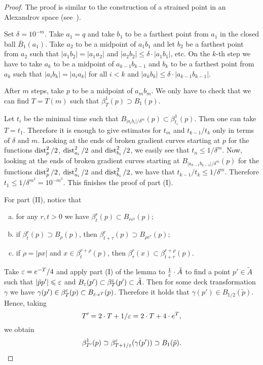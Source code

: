\documentclass{amsart}
\begin{document}
\begin{proof}
The proof is similar to the construction of a strained point in an  Alexandrov space (see~\cite{BGP}).

Set $\delta=10^{-m}$.
Take $a_1=q$ and take $b_1$ to be a farthest point from $a_1$ in the closed ball $\bar B_1(a_1)$.
Take $a_2$ to be a midpoint of $a_1b_1$ and let  $b_2$ be
a farthest point from $a_2$
such that $|a_1b_2|=|a_1a_2|$ and $|a_2b_2|\le\delta\cdot |a_1b_1|$, etc.
On the $k$-th step we have to take $a_{k}$ to be a midpoint of
$a_{k-1}b_{k-1}$
and $b_{k}$
to be a farthest point from $a_{k}$
such that $|a_ib_{k}|=|a_ia_{k}|$ for all $i< k$  and
$|a_{k}b_{k}|\le\delta\cdot  |a_{k-1}b_{k-1}|$.

After $m$ steps, take $p$ to be a midpoint of $a_mb_m$.
We only have to check that we can find $T=T(m)$
such that $\beta^{1}_T(p)\supset B_1(p)$.

Let $t_i$ be the minimal time such that $B_{|a_ib_i|/\delta^m}(p)\subset \beta^{1}_{t_i}(p)$.
Then one can take $T=t_1$.
Therefore it is enough to give estimates for $t_m$ and $t_{k-1}/t_k$ only in terms of $\delta$ and $m$.
Looking at the ends of broken gradient curves
starting at $p$
for the functions $\operatorname{\rm dist}^2_{p}/2$, $\operatorname{\rm dist}^2_{a_i}/2$
and $ \operatorname{\rm dist}^2_{b_i}/2$, we easily see that $t_n\le 1/\delta^m$.
Now, looking
at the ends of broken gradient curves
starting at $ B_{|a_{k-1}b_{k-1}|/\delta^m}(p)$ for
the functions $\operatorname{\rm dist}^2_{p}/2$, $\operatorname{\rm dist}^2_{a_i}/2$
and $ \operatorname{\rm dist}^2_{b_i}/2$,
we have that $t_{k-1}/t_{k}\le 1/\delta^m$.
Therefore $t_1\le 1/\delta^{m^2}=10^{-m^3}$.
This finishes the proof of part (I).

For part (II),
notice that
\begin{enumerate}[a)]
\item for any $r,t>0$ we have
$\beta^r_t(p)\subset B_{re^t}(p);$
\item if $\beta^r_t(p)\supset B_{\rho}(p)$, then
$\beta^r_{t+\tau}(p)\supset B_{\rho e^\tau}(p);$
\item if $\rho=|px|$ and $x\in \beta^{r+\rho}_t(p)$,
then $\beta^{r}_\tau(x)\subset \beta^{r+\rho}_{t+\tau}(p)$.
\end{enumerate}
Take $\varepsilon=e^{-T}/4$ and apply part (I) of the lemma to $\frac1{\varepsilon}\cdot \tilde A$
to find a point $p'\in \tilde A$ such that $|\tilde pp'|\leqslant \varepsilon$
and $B_{\varepsilon}(p')\subset \beta^{\varepsilon}_{T}(p')\subset \tilde A$.
Then for some deck transformation $\gamma$
we have $\gamma(p')\in \beta^\varepsilon_T(p)\subset B_{\varepsilon\cdot  e^T}(p)$.
Therefore it holds that $\gamma(p')\in B_{1/2}(\tilde p)$.
Hence, taking
$$T'=2\cdot T+1/\varepsilon=2\cdot T+4\cdot e^{T},$$
we obtain
$$\beta^{1}_{T'}(p)\supset \beta^\varepsilon_{T+1/\varepsilon}(\gamma(p'))
\supset B_1(\tilde p).$$
\end{proof}
\end{document}
